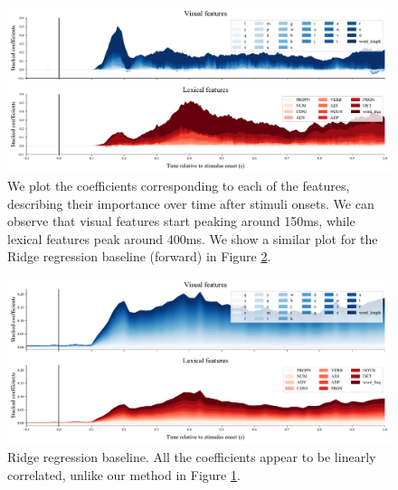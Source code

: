 \begin{figure}
  \centering
  \includegraphics[width=\textwidth, trim=0cm 0cm 0cm 0cm, clip=True]{figures/meg_result.pdf}
  \caption{We plot the coefficients corresponding to each of the features,
  describing their importance over time after stimuli onsets. We can observe that visual features start peaking around 150ms, while lexical features peak around 400ms. We show a similar plot for the Ridge regression baseline (forward) in Figure \ref{fig:ridgebaselineresult}.}
  \label{fig:megresult}
\end{figure}

\begin{figure}
  \centering
  \includegraphics[width=\textwidth, trim=0cm 0cm 0cm 0cm, clip=True]{figures/ridgecv_baseline_result.pdf}
  \caption{Ridge regression baseline. All the coefficients appear to be
  linearly correlated, unlike our method in Figure \ref{fig:megresult}.}
  \label{fig:ridgebaselineresult}
\end{figure}
